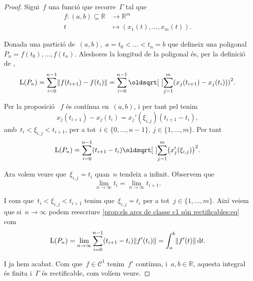 \documentclass[../../main.tex]{subfiles}
\begin{document}
    \begin{proof}
        Sigui~\(f\) una funció que recorre~\(\Gamma\) tal que
        \begin{align*}
        f\colon(a,b)\subseteq\mathbb{R}&\longrightarrow\mathbb{R}^{m}\\
        t&\longmapsto(x_{1}(t),\dots,x_{m}(t)).
        \end{align*}

        Donada una partició de~\((a,b)\),~\(a=t_{0}<\dots<t_{n}=b\) que defineix una poligonal~\(P_{n}=f(t_{0}),\dots,f(t_{n})\).
        Aleshores la longitud de la poligonal  és, per la definició de ,
        \[
            \Long(P_n)=\sum_{i=0}^{n-1}\norm{f(t_{i+1})-f(t_{i})}=\sum_{i=0}^{n-1}\sqrt{\sum_{j=1}^{m}\left(x_{j}(t_{i+1})-x_{j}(t_{i}))\right)^{2}}.
        \]

        Per la proposició ~\(f\) és contínua en~\((a,b)\), i per tant pel  tenim
        \[
            x_{j}(t_{i+1})-x_{j}(t_{i})=x_{j}'(\xi_{i,j})(t_{i+1}-t_{i}),
        \]
        amb~\(t_{i}<\xi_{i,j}<t_{i+1}\), per a tot~\(i\in\{0,\dots,n-1\},\ j\in\{1,\dots,m\}\).
        Per tant
        \begin{equation}\label{prop:els arcs de classe c1 són rectificables:eq}
        \Long(P_{n})=\sum_{i=0}^{n-1}(t_{i+1}-t_{i})\sqrt{\sum_{j=1}^{m}\left(x_{j}'(\xi_{i,j})\right)^2}.
        \end{equation}

        Ara volem veure que~\(\xi_{i,j}=t_{i}\) quan~\(n\) tendeix a infinit.
        Observem que
        \[
            \lim_{n\to\infty}t_{i}=\lim_{n\to\infty}t_{i+1}.
        \]

        I com que~\(t_{i}<\xi_{i,j}<t_{i+1}\) tenim que~\(\xi_{i,j}=t_{i}\) per a tot~\(j\in\{1,\dots,m\}\).
        Així veiem que si~\(n\to\infty\) podem reescriure \eqref{prop:els arcs de classe c1 són rectificables:eq} com
        \begin{displaymath}
        \Long(P_{n})=\lim_{n\to\infty}\sum_{i=0}^{n-1}(t_{i+1}-t_{i})\norm{f'(t_{i})}=\int_{a}^{b}\norm{f'(t)}\diff t.
        \end{displaymath}

        I ja hem acabat.
        Com que~\(f\in\mathcal{C}^{1}\) tenim~\(f'\) contínua, i~\(a,b\in\mathbb{R}\), aquesta integral és finita i~\(\Gamma\) és rectificable, com volíem veure.
    \end{proof}
\end{document}
